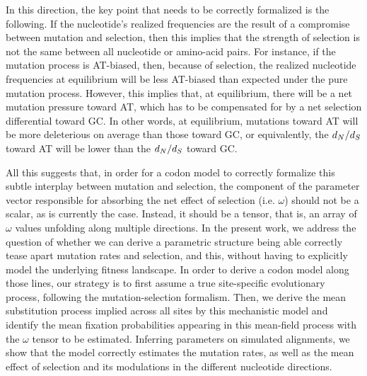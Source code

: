 In this direction, the key point that needs to be correctly formalized is the following.
If the nucleotide's realized frequencies are the result of a compromise between mutation and selection, then this implies that the strength of selection is not the same between all nucleotide or amino-acid pairs.
For instance, if the mutation process is AT-biased, then, because of selection, the realized nucleotide frequencies at equilibrium will be less AT-biased than expected under the pure mutation process.
However, this implies that, at equilibrium, there will be a net mutation pressure toward AT, which has to be compensated for by a net selection differential toward GC.
In other words, at equilibrium, mutations toward AT will be more deleterious on average than those toward GC, or equivalently, the $d_N / d_S$ toward AT will be lower than the $d_N / d_S$ toward GC.

All this suggests that, in order for a codon model to correctly formalize this subtle interplay between mutation and selection, the component of the parameter vector responsible for absorbing the net effect of selection (i.e. $\omega$) should not be a scalar, as is currently the case.
Instead, it should be a tensor, that is, an array of $\omega$ values unfolding along multiple directions.
In the present work, we address the question of whether we can derive a parametric structure being able correctly tease apart mutation rates and selection, and this, without having to explicitly model the underlying fitness landscape.
In order to derive a codon model along those lines, our strategy is to first assume a true site-specific evolutionary process, following the mutation-selection formalism.
Then, we derive the mean substitution process implied across all sites by this mechanistic model and identify the mean fixation probabilities appearing in this mean-field process with the $\omega$ tensor to be estimated.
Inferring parameters on simulated alignments, we show that the model correctly estimates the mutation rates, as well as the mean effect of selection and its modulations in the different nucleotide directions.



